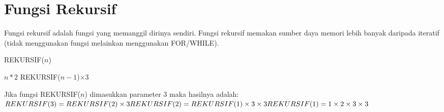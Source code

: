 \section{Fungsi Rekursif}
Fungsi rekursif adalah fungsi yang memanggil dirinya sendiri. Fungsi rekursif memakan sumber daya memori lebih banyak daripada iteratif (tidak menggunakan fungsi melainkan menggunakan FOR/WHILE).

\begin{contoh}
	\begin{algorithm}[H]
		\caption{REKURSIF($n$)}
		\begin{algorithmic}[1]
				\RETURN $n*2$
			\ELSE
				\RETURN REKURSIF($n-1$)$\times{}$3
			\ENDIF
		\end{algorithmic}		
	\end{algorithm}
	
	Jika fungsi REKURSIF($n$) dimasukkan parameter 3 maka hasilnya adalah:\\
	\begin{math}
	REKURSIF(3) = REKURSIF(2)\times{}3\\
	REKURSIF(2) = REKURSIF(1)\times{}3\times{}3\\
	REKURSIF(1) = 1\times{}2\times{}3\times{}3\\
	\end{math}
\end{contoh}